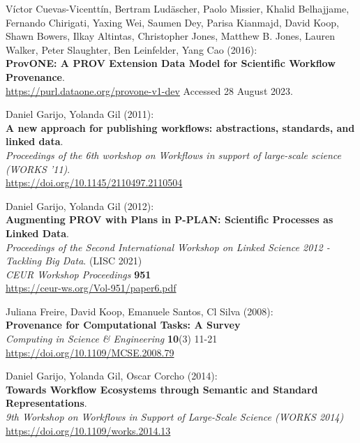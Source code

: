 \documentclass[10pt,letterpaper]{article}
\begin{document}
\begin{thebibliography}{10}
\begin{small}
Víctor Cuevas-Vicenttín, Bertram Ludäscher, Paolo Missier, Khalid Belhajjame, Fernando Chirigati, Yaxing Wei, Saumen Dey, Parisa Kianmajd, David Koop, Shawn Bowers, Ilkay Altintas, Christopher Jones, Matthew B. Jones, Lauren Walker, Peter Slaughter, Ben Leinfelder, Yang Cao (2016):\\
\textbf{ProvONE: A PROV Extension Data Model for Scientific Workflow Provenance}.\\
\url{https://purl.dataone.org/provone-v1-dev}
Accessed 28 August 2023.

Daniel Garijo, Yolanda Gil (2011):\\
\textbf{A new approach for publishing workflows: abstractions, standards, and linked data}.\\
\emph{Proceedings of the 6th workshop on Workflows in support of large-scale science (WORKS '11)}.\\
\url{https://doi.org/10.1145/2110497.2110504}

Daniel Garijo, Yolanda Gil (2012):\\
\textbf{Augmenting PROV with Plans in P-PLAN: Scientific Processes as Linked Data}.\\
\emph{Proceedings of the Second International Workshop on Linked Science 2012 - Tackling Big Data}. (LISC 2021)\\
\emph{CEUR Workshop Proceedings} \textbf{951}\\
\url{https://ceur-ws.org/Vol-951/paper6.pdf}

Juliana Freire, David Koop, Emanuele Santos, Cl Silva (2008):\\
\textbf{Provenance for Computational Tasks: A Survey}\\
\emph{Computing in Science \& Engineering} \textbf{10}(3) 11-21\\
\url{https://doi.org/10.1109/MCSE.2008.79}


Daniel Garijo, Yolanda Gil, Oscar Corcho (2014):\\
\textbf{Towards Workflow Ecosystems through Semantic and Standard Representations}.\\
\emph{9th Workshop on Workflows in Support of Large-Scale Science (WORKS 2014)}\\
\url{https://doi.org/10.1109/works.2014.13} 


\end{small}
\end{thebibliography}
\end{document}
